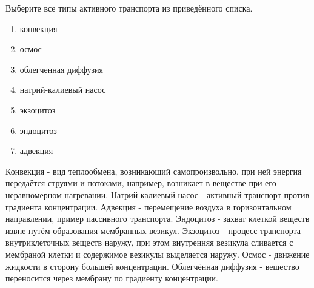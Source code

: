 
Выберите все типы активного транспорта из приведённого списка.

\begin{enumerate}
    \item конвекция
    \item осмос
    \item облегченная диффузия
    \item натрий-калиевый насос
    \item экзоцитоз
    \item эндоцитоз
    \item адвекция
   
\end{enumerate}

\explanationSection

Конвекция - вид теплообмена, возникающий самопроизвольно, при ней энергия передаётся струями и потоками, например, возникает в веществе при его неравномерном нагревании. Натрий-калиевый насос - активный транспорт против градиента концентрации. Адвекция - перемещение воздуха в горизонтальном направлении, пример пассивного транспорта. Эндоцитоз - захват клеткой веществ извне путём образования мембранных везикул. Экзоцитоз - процесс транспорта внутриклеточных веществ наружу, при этом внутренняя везикула сливается с мембраной клетки и содержимое везикулы выделяется наружу. Осмос - движение жидкости в сторону большей концентрации. Облегчённая диффузия - вещество переносится через мембрану по градиенту концентрации. 

